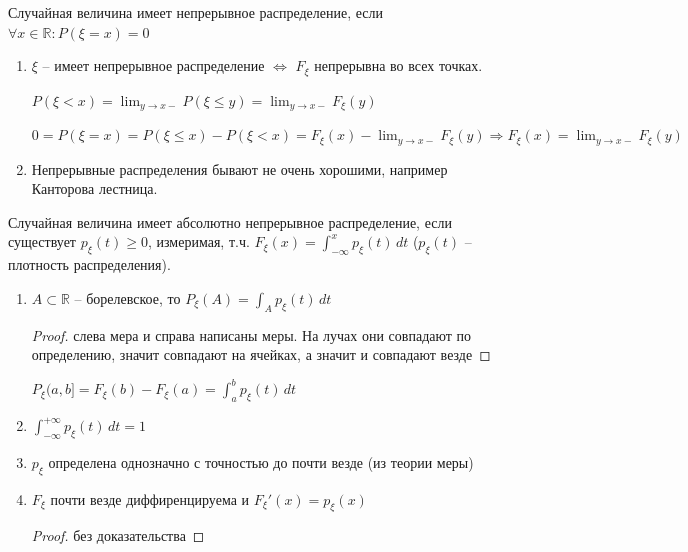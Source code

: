 \begin{definition}
    Случайная величина имеет непрерывное распределение, если
    $\forall x\in \mathbb{R}: P(\xi = x) = 0$

    \begin{remark}
        \begin{enumerate}
            \item {
                $\xi$ -- имеет непрерывное распределение $\Longleftrightarrow$ $F_{\xi}$ непрерывна во всех точках.

                $P(\xi < x) = \lim_{y\rightarrow x-}P(\xi \leq y) = \lim_{y\rightarrow x-} F_{\xi}(y)$

                $0 = P(\xi = x) = P(\xi \leq x) - P(\xi < x) = F_{\xi}(x) - \lim_{y\rightarrow x-}F_{\xi}(y) \Rightarrow F_{\xi}(x) = \lim_{y\rightarrow x-}F_{\xi}(y)$
            }
            \item {
                Непрерывные распределения бывают не очень хорошими, например
                Канторова лестница.
            }
        \end{enumerate}
    \end{remark}
\end{definition}

\begin{definition}
    Случайная величина имеет абсолютно непрерывное распределение, если
    существует $p_{\xi} (t) \geqslant 0$, измеримая, т.ч. $F_{\xi} (x) =
    \int_{-\infty}^x p_{\xi} (t) \, dt$ ($p_{\xi}(t)$ -- плотность распределения).
\end{definition}

\begin{properties}
    \begin{enumerate}
        \item {
            $A \subset \mathbb{R}$ -- борелевское, то $P_{\xi} (A) = \int_{A} p_{\xi} (t) \, dt$

            \begin{proof}
                слева мера и справа написаны меры. На лучах они совпадают по определению, значит совпадают
                на ячейках, а значит и совпадают везде
            \end{proof}

            $P_{\xi} (a, b] = F_{\xi} (b) - F_{\xi} (a) = \int_{a}^b p_{\xi} (t) \, dt$
        }
        \item {
            $\int_{-\infty}^{+\infty} p_{\xi} (t) \, dt = 1$
        }
        \item {
            $p_{\xi}$ определена однозначно с точностью до почти везде (из теории меры)
        }
        \item {
            $F_{\xi}$ почти везде диффиренцируема и $F_{\xi}' (x) = p_{\xi} (x)$

            \begin{proof}
                без доказательства
            \end{proof}
        }
    \end{enumerate}
\end{properties}

